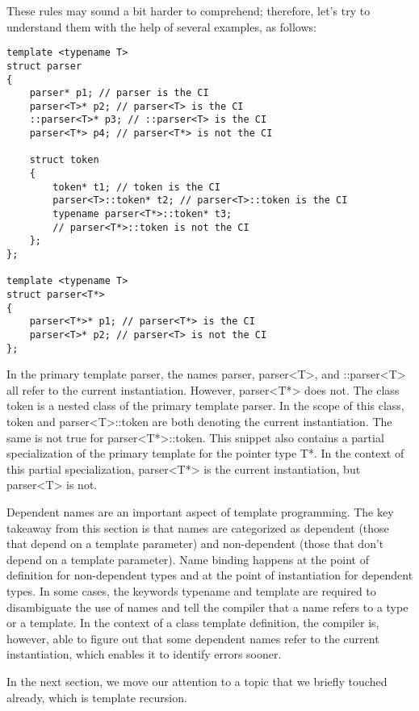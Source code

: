 These rules may sound a bit harder to comprehend; therefore, let’s try to understand them with the help of several examples, as follows:

\begin{lstlisting}[style=styleCXX]
template <typename T>
struct parser
{
	parser* p1; // parser is the CI
	parser<T>* p2; // parser<T> is the CI
	::parser<T>* p3; // ::parser<T> is the CI
	parser<T*> p4; // parser<T*> is not the CI
	
	struct token
	{
		token* t1; // token is the CI
		parser<T>::token* t2; // parser<T>::token is the CI
		typename parser<T*>::token* t3;
		// parser<T*>::token is not the CI
	};
};

template <typename T>
struct parser<T*>
{
	parser<T*>* p1; // parser<T*> is the CI
	parser<T>* p2; // parser<T> is not the CI
};
\end{lstlisting}

In the primary template parser, the names parser, parser<T>, and ::parser<T> all refer to the current instantiation. However, parser<T*> does not. The class token is a nested class of the primary template parser. In the scope of this class, token and parser<T>::token are both denoting the current instantiation. The same is not true for parser<T*>::token. This snippet also contains a partial specialization of the primary template for the pointer type T*. In the context of this partial specialization, parser<T*> is the current instantiation, but parser<T> is not.

Dependent names are an important aspect of template programming. The key takeaway from this section is that names are categorized as dependent (those that depend on a template parameter) and non-dependent (those that don’t depend on a template parameter). Name binding happens at the point of definition for non-dependent types and at the point of instantiation for dependent types. In some cases, the keywords typename and template are required to disambiguate the use of names and tell the compiler that a name refers to a type or a template. In the context of a class template definition, the compiler is, however, able to figure out that some dependent names refer to the current instantiation, which enables it to identify errors sooner.

In the next section, we move our attention to a topic that we briefly touched already, which is template recursion.























